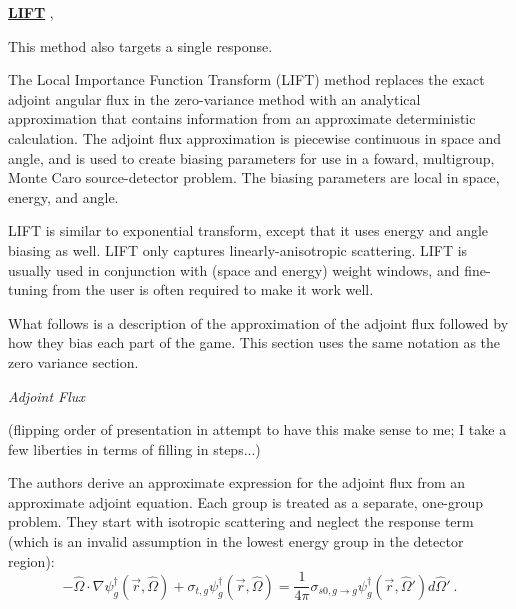 \documentclass[12pt,twoside]{article}
\newcommand{\vOmega}{\ensuremath{\hat{\Omega}}}
\begin{document}
\begin{center}
\underline{\textbf{LIFT}} \cite{Turner1997a}, \cite{Turner1997b}
\end{center}

This method also targets a single response.

The Local Importance Function Transform (LIFT) method replaces the exact adjoint angular flux in the zero-variance method with an analytical approximation that contains information from an approximate deterministic calculation. The adjoint flux approximation is piecewise continuous in space and angle, and is used to create biasing parameters for use in a foward, multigroup, Monte Caro source-detector problem. The biasing parameters are local in space, energy, and angle. 

LIFT is similar to exponential transform, except that it uses energy and angle biasing as well. LIFT only captures linearly-anisotropic scattering. LIFT is usually used in conjunction with (space and energy) weight windows, and fine-tuning from the user is often required to make it work well. 

What follows is a description of the approximation of the adjoint flux followed by how they bias each part of the game. This section uses the same notation as the zero variance section. 

\vspace*{1em}
\noindent \textit{Adjoint Flux}

(flipping order of presentation in attempt to have this make sense to me; I take a few liberties in terms of filling in steps...)

The authors derive an approximate expression for the adjoint flux from an approximate adjoint equation. Each group is treated as a separate, one-group problem. They start with isotropic scattering and neglect the response term (which is an invalid assumption in the lowest energy group in the detector region):
\begin{equation}
 -\vOmega \cdot \nabla \psi^{\dagger}_{g} (\vec{r}, \vOmega) + \sigma_{t,g} \psi^{\dagger}_{g} (\vec{r}, \vOmega)
 = \frac{1}{4\pi} \sigma_{s0, g \rightarrow g}  \psi^{\dagger}_{g} (\vec{r}, \vOmega') d\vOmega' \:.
 \label{eq:approxAdjTE} 
\end{equation}
\end{document}
